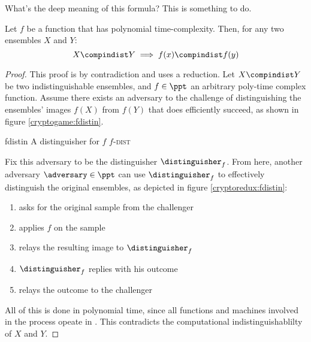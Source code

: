 What's the deep meaning of this formula? This is something to do.

\begin{lemma} \label{lem:compmall}
    Let $f$ be a function that has polynomial time-complexity. Then, for any two ensembles $X$ and $Y$:
    \[
        X \compindist Y \implies f(x) \compindist f(y)
    \]
\end{lemma}

\begin{proof}
    This proof is by contradiction and uses a reduction. Let $X \compindist Y$ be two indistinguishable ensembles, and $f \in \ppt$ an arbitrary poly-time complex function. Assume there exists an adversary \adversary{} to the challenge of distinguishing the ensembles' images $f(X)$ from $f(Y)$ that does efficiently succeed, as shown in figure \ref{cryptogame:fdistin}. 
    
    \begin{cryptogame}
        {fdistin}
        {A distinguisher for $f$}
        {$f$-\textsc{dist}}


        \cseqdelay


    \end{cryptogame}
    
    Fix this adversary to be the distinguisher $\distinguisher_f$. From here, another adversary $\adversary \in \ppt$ can use $\distinguisher_f$ to effectively distinguish the original ensembles, as depicted in figure \ref{cryptoredux:fdistin}:
    \begin{enumerate}
        \item \adversary{} asks for the original sample from the challenger
        \item \adversary{} applies $f$ on the sample
        \item \adversary{} relays the resulting image to $\distinguisher_f$
        \item $\distinguisher_f$ replies with his outcome
        \item \adversary{} relays the outcome to the challenger
    \end{enumerate}
    All of this is done in polynomial time, since all functions and machines involved in the process opeate in \ppt. This contradicts the computational indistinguishablilty of $X$ and $Y$.


\end{proof}
